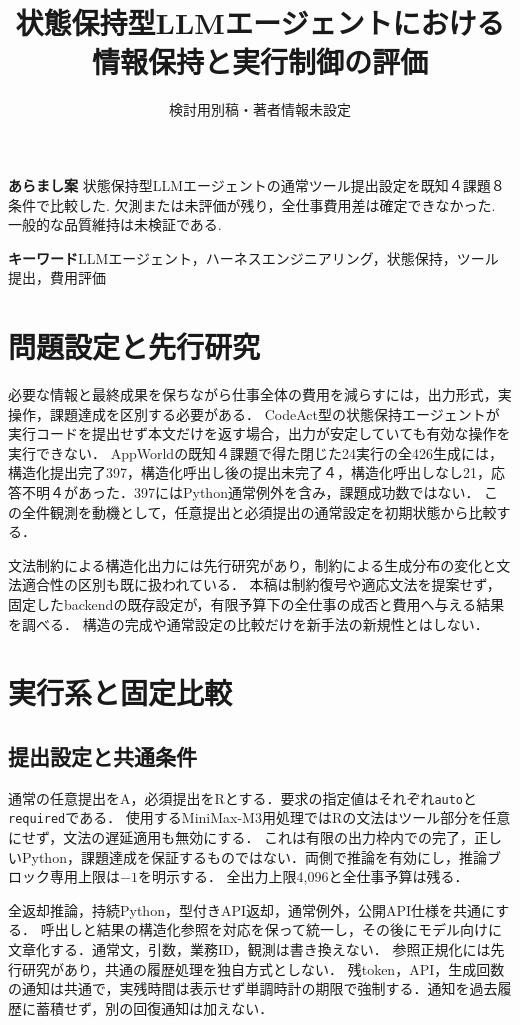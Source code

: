 \documentclass[uplatex,a4paper,twocolumn,10pt]{jsarticle}
\title{状態保持型LLMエージェントにおける\newline 情報保持と実行制御の評価}
\author{検討用別稿・著者情報未設定}
\date{}
\begin{document}
\raggedbottom
\maketitle
\noindent\textbf{あらまし案}\quad
状態保持型LLMエージェントの通常ツール提出設定を既知４課題８条件で比較した. 欠測または未評価が残り，全仕事費用差は確定できなかった. 一般的な品質維持は未検証である.

\noindent\textbf{キーワード}\quad LLMエージェント，ハーネスエンジニアリング，状態保持，ツール提出，費用評価

\section{問題設定と先行研究}
必要な情報と最終成果を保ちながら仕事全体の費用を減らすには，出力形式，実操作，課題達成を区別する必要がある．
CodeAct\cite{codeact}型の状態保持エージェントが実行コードを提出せず本文だけを返す場合，出力が安定していても有効な操作を実行できない．
AppWorld\cite{appworld}の既知４課題で得た閉じた24実行の全426生成には，構造化提出完了397，構造化呼出し後の提出未完了４，構造化呼出しなし21，応答不明４があった．397にはPython通常例外を含み，課題成功数ではない．
この全件観測を動機として，任意提出と必須提出の通常設定を初期状態から比較する．

文法制約による構造化出力\cite{gcd}には先行研究があり，制約による生成分布の変化と文法適合性の区別\cite{gad}も既に扱われている．
本稿は制約復号や適応文法を提案せず，固定したbackend\cite{backend}の既存設定が，有限予算下の全仕事の成否と費用へ与える結果を調べる．
構造の完成や通常設定の比較だけを新手法の新規性とはしない．

\section{実行系と固定比較}
\subsection{提出設定と共通条件}
通常の任意提出をA，必須提出をRとする．要求の指定値はそれぞれ\texttt{auto}と\texttt{required}である．
使用するMiniMax-M3用処理ではRの文法はツール部分を任意にせず，文法の遅延適用も無効にする．
これは有限の出力枠内での完了，正しいPython，課題達成を保証するものではない．両側で推論を有効にし，推論ブロック専用上限は$-1$を明示する．
全出力上限4,096と全仕事予算は残る．

全返却推論，持続Python，型付きAPI返却，通常例外，公開API仕様を共通にする．
呼出しと結果の構造化参照を対応を保って統一し，その後にモデル向けに文章化する．通常文，引数，業務ID，観測は書き換えない．
参照正規化には先行研究\cite{canonical}があり，共通の履歴処理を独自方式としない．
残token，API，生成回数の通知は共通で，実残時間は表示せず単調時計の期限で強制する．通知を過去履歴に蓄積せず，別の回復通知は加えない．
\end{document}
